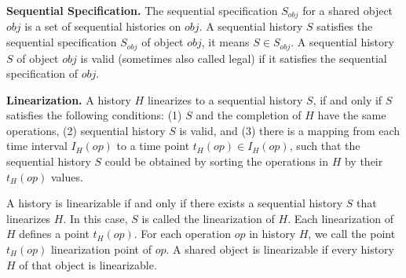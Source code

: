 \textbf{Sequential Specification.} The sequential specification $S_{obj}$ for a shared object $obj$ is a set of sequential histories on $obj$. A sequential history $S$ satisfies the sequential specification $S_{obj}$ of object $obj$, it means $S \in S_{obj}$. A sequential history $S$ of object $obj$ is valid (sometimes also called legal) if it satisfies the sequential specification of $obj$.

\textbf{Linearization.} A history $H$ linearizes to a sequential history $S$, if and only if $S$ satisfies the following conditions: (1) $S$ and the completion of $H$ have the same operations, (2) sequential history $S$ is valid, and (3) there is a mapping from each time interval $I_H(op)$ to a time point $t_H(op) \in I_H(op)$, such that the sequential history $S$ could be obtained by sorting the operations in $H$ by their $t_H(op)$ values.

A history is linearizable if and only if there exists a sequential history $S$ that linearizes $H$. In this case, $S$ is called the linearization of $H$. Each linearization of $H$ defines a point $t_H(op)$. For each operation $op$ in history $H$, we call the point $t_H(op)$ linearization point of $op$. A shared object is linearizable if every history $H$ of that object is linearizable.



